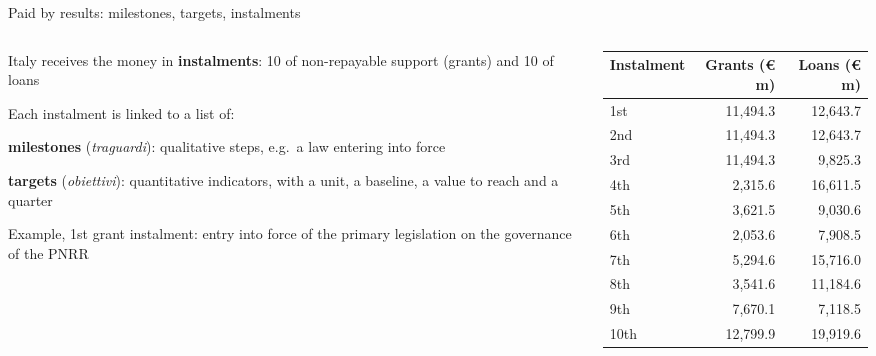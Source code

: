 \documentclass[aspectratio=169,xcolor=table]{beamer}
\begin{document}
\begin{frame}{Paid by results: milestones, targets, instalments}
\begin{columns}[T]
\begin{column}{0.5\textwidth}
\footnotesize
\bi
  \item Italy receives the money in \textbf{instalments}: 10 of non-repayable support (grants) and 10 of loans
  \item Each instalment is linked to a list of:
    \bi
      \item \textbf{milestones} (\textit{traguardi}): qualitative steps, e.g.\ a law entering into force
      \item \textbf{targets} (\textit{obiettivi}): quantitative indicators, with a unit, a baseline, a value to reach and a quarter
    \ei
  \item Example, 1st grant instalment: entry into force of the primary legislation on the governance of the PNRR
\ei
\end{column}
\begin{column}{0.46\textwidth}
\centering\scriptsize
\begin{tabular}{lrr}
\toprule
\textbf{Instalment} & \textbf{Grants (€ m)} & \textbf{Loans (€ m)} \\
\midrule
1st  & 11,494.3 & 12,643.7 \\
2nd  & 11,494.3 & 12,643.7 \\
3rd  & 11,494.3 & 9,825.3 \\
4th  & 2,315.6  & 16,611.5 \\
5th  & 3,621.5  & 9,030.6 \\
6th  & 2,053.6  & 7,908.5 \\
7th  & 5,294.6  & 15,716.0 \\
8th  & 3,541.6  & 11,184.6 \\
9th  & 7,670.1  & 7,118.5 \\
10th & 12,799.9 & 19,919.6 \\
\bottomrule
\end{tabular}
\end{column}
\end{columns}
\end{frame}
\end{document}
